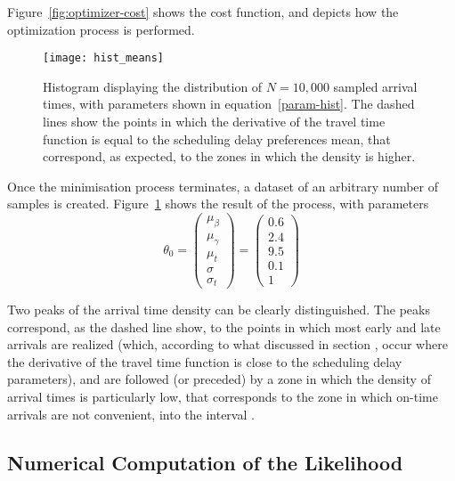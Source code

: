 Figure~\ref{fig:optimizer-cost} shows the cost function,
and depicts how the optimization process is performed.

\begin{figure}
  \centering
  \texttt{[image: hist\_means]}
  \caption{
    Histogram displaying the distribution of \(N=10,000\) sampled arrival times,
    with parameters shown in equation~\eqref{param-hist}.
    The dashed lines show the points in which the derivative of the travel time function is equal to the scheduling delay preferences mean,
    that correspond, as expected,
    to the zones in which the density is higher.
  }
  \label{fig:hist-means}
\end{figure}

Once the minimisation process terminates,
a dataset of an arbitrary number of samples is created.
Figure~\ref{fig:hist-means} shows the result of the process,
with parameters
\begin{equation}
  \label{param-hist}
  \theta_0 =
  \begin{pmatrix}
    \mu_\beta \\
    \mu_\gamma \\
    \mu_t \\
    \sigma \\
    \sigma_t
  \end{pmatrix}
  =
  \begin{pmatrix}
    0.6 \\
    2.4 \\
    9.5 \\
    0.1 \\
    1
  \end{pmatrix}
\end{equation}

Two peaks of the arrival time density can be clearly distinguished.
The peaks correspond, as the dashed line show, to the points in which most early and late arrivals are realized
(which, according to what discussed in section ,
occur where the derivative of the travel time function is close to the scheduling delay parameters),
and are followed (or preceded) by a zone in which the density of arrival times is particularly low,
that corresponds to the zone in which on-time arrivals are not convenient,
into the interval .

\subsection{Numerical Computation of the Likelihood}

